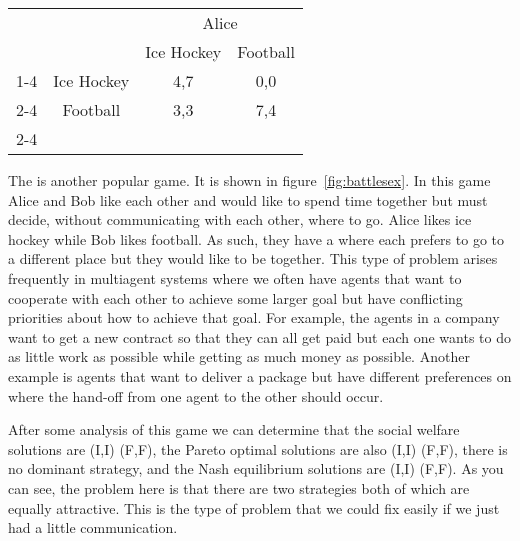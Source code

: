 \begin{SCfigure}
  \begin{minipage}{1.0\linewidth}
    \begin{center}
      \renewcommand\arraystretch{1.5}
      \begin{tabular}{cc|c|c|}
        &    &\multicolumn{2}{c}{Alice} \\ 
        &      &Ice Hockey&Football \\ \cline{1-4}
        \multirow{2}{2em}{Bob}
        & Ice Hockey  &4,7 & 0,0 \\ \cline{2-4}
        & Football  &3,3 & 7,4 \\ \cline{2-4}
      \end{tabular}
    \end{center}
  \end{minipage}
  \caption{Battle of the sexes game.}
  \label{fig:battlesex}
\end{SCfigure}


\medskip The  is another popular game. It is
shown in figure~\ref{fig:battlesex}. In this game Alice and Bob like
each other and would like to spend time together but must decide,
without communicating with each other, where to go. Alice likes ice
hockey while Bob likes football. As such, they have a
 where each prefers to go to a different
place but they would like to be together. This type of problem arises
frequently in multiagent systems where we often have agents that want
to cooperate with each other to achieve some larger goal but have
conflicting priorities about how to achieve that goal.  For example,
the agents in a company want to get a new contract so that they can
all get paid but each one wants to do as little work as possible while
getting as much money as possible. Another example is agents that want
to deliver a package but have different preferences on where the
hand-off from one agent to the other should occur.

After some analysis of this game we can determine that the social
welfare solutions are (I,I) (F,F), the Pareto optimal solutions are
also (I,I) (F,F), there is no dominant strategy, and the Nash
equilibrium solutions are (I,I) (F,F). As you can see, the problem
here is that there are two strategies both of which are equally
attractive. This is the type of problem that we could fix easily if we
just had a little communication.

